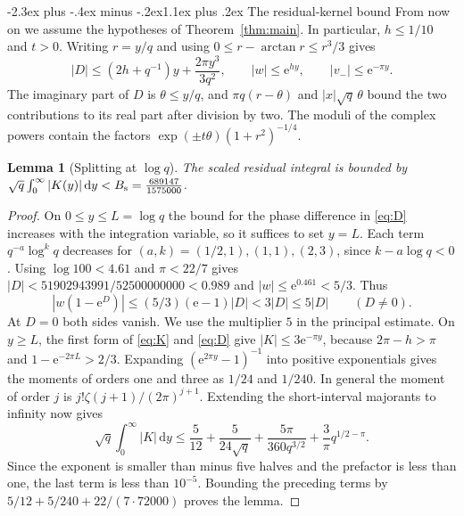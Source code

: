 \documentclass[11pt,a4paper]{article}
\makeatletter
\newtheorem{lemma}[theorem]{Lemma}
\newcommand{\dd}{\,\mathrm d}
\newcommand{\e}{\mathrm e}
\renewcommand\section{\@startsection{section}{1}{\z@}
  {-2.3ex plus -.4ex minus -.2ex}{1.1ex plus .2ex}
  {\normalfont\large\bfseries\centering}}
\makeatother
\begin{document}
\section{The residual-kernel bound}
From now on we assume the hypotheses of Theorem~\ref{thm:main}. In particular, $h\le1/10$ and $t>0$.
Writing $r=y/q$ and using $0\le r-\arctan r\le r^3/3$ gives
\begin{equation}\label{eq:D}
 |D|\le (2h+q^{-1})y+\frac{2\pi y^3}{3q^2},\qquad
 |w|\le\e^{hy},\qquad |v_-|\le\e^{-\pi y}.
\end{equation}
The imaginary part of $D$ is $\theta\le y/q$, and
$\pi q(r-\theta)$ and $|x|\sqrt q\,\theta$ bound the two contributions to
its real part after division by two. The moduli of the complex powers
contain the factors $\exp(\pm t\theta)(1+r^2)^{-1/4}$.

\begin{lemma}[Splitting at $\log q$]\label{lem:local}
The scaled residual integral is bounded by
$\sqrt q\int_0^\infty |K(y)|\dd y < B_{\rm s}=\frac{689147}{1575000}$.
\end{lemma}
\begin{proof}
On $0\le y\le L=\log q$ the bound for the phase difference in \eqref{eq:D}
increases with the integration variable, so it suffices to set $y=L$. Each term $q^{-a}\log^kq$ decreases for
$(a,k)=(1/2,1),(1,1),(2,3)$, since $k-a\log q<0$. Using
$\log100<4.61$ and $\pi<22/7$ gives
$|D|<51902943991/52500000000<0.989$ and $|w|\le\e^{0.461}<5/3$.
Thus
\[
 |w(1-\e^D)|\le (5/3)(\e-1)|D|<3|D|\le5|D|\qquad(D\ne0).
\]
At $D=0$ both sides vanish. We use the multiplier $5$ in the principal
estimate. On $y\ge L$, the first form of \eqref{eq:K}
and \eqref{eq:D} give $|K|\le3\e^{-\pi y}$, because
$2\pi-h>\pi$ and $1-\e^{-2\pi L}>2/3$.
Expanding $(\e^{2\pi y}-1)^{-1}$ into positive exponentials gives
the moments of orders one and three as $1/24$ and $1/240$.
In general the moment of order $j$ is $j!\zeta(j+1)/(2\pi)^{j+1}$.
Extending the short-interval majorants to infinity now gives
\[
 \sqrt q\int_0^\infty |K|\dd y\le
 \frac5{12}+\frac5{24\sqrt q}+\frac{5\pi}{360q^{3/2}}
 +\frac3\pi q^{1/2-\pi}.
\]
Since the exponent is smaller than minus five halves and the prefactor is less than one, the last term is less than $10^{-5}$. Bounding the preceding terms by
$5/12+5/240+22/(7\cdot72000)$ proves the lemma.
\end{proof}
\end{document}
